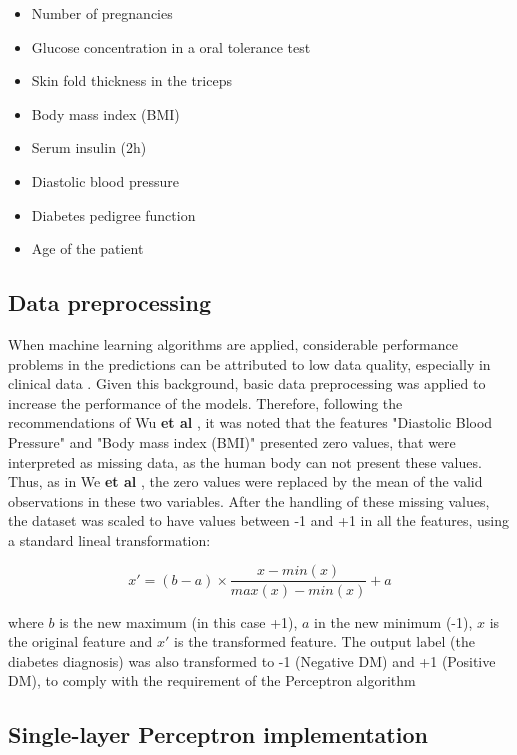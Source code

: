 \documentclass[10pt,twocolumn,letterpaper]{article}
\begin{document}
\begin{itemize}
	\item Number of pregnancies
	\item Glucose concentration in a oral tolerance test
	\item Skin fold thickness in the triceps
	\item Body mass index (BMI)
	\item Serum insulin (2h)
	\item Diastolic blood pressure
	\item Diabetes pedigree function
	\item Age of the patient
\end{itemize}

\subsection{Data preprocessing}

When machine learning algorithms are applied, considerable performance problems in the predictions can be attributed to low data quality, especially in clinical data \cite{Installe2014}. Given this background, basic data preprocessing was applied to increase the performance of the models. Therefore, following the recommendations of Wu \textbf{et al} \cite{Wu2018}, it was noted that the features "Diastolic Blood Pressure" and "Body mass index (BMI)" presented zero values, that were interpreted as missing data, as the human body can not present these values. Thus, as in We \textbf{et al} \cite{Wu2018}, the zero values were replaced by the mean of the valid observations in these two variables. 
After the handling of these missing values, the dataset was scaled to have values between -1 and +1 in all the features, using a standard lineal transformation:

\begin{equation}
	x' = (b-a) \times \frac{x - min(x)}{max(x)-min(x)} + a
\end{equation}

where $b$ is the new maximum (in this case +1), $a$ in the new minimum (-1), $x$ is the original feature and $x'$ is the transformed feature.
The output label (the diabetes diagnosis) was also transformed to -1 (Negative DM) and +1 (Positive DM), to comply with the requirement of the Perceptron algorithm

\subsection{Single-layer Perceptron implementation}
\end{document}
